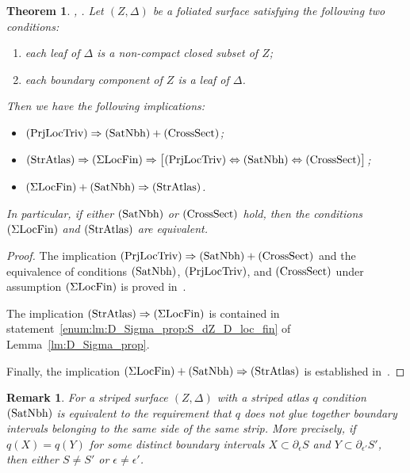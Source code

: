 \documentclass[12pt, reqno]{amsart}
\newcommand{\theoremname}{Theorem}%
\newcommand{\remarkname}{Remark}%
\newtheorem{theorem}[subsection]{\protect\theoremname}
\newtheorem{remark}[subsection]{\protect\remarkname}
\newcommand\Xsp{X}
\newcommand\Ysp{Y}
\newcommand{\Partition}{\Delta}
\newcommand{\strip}{S}
\newcommand{\stripSurf}{Z}
\newcommand{\qmap}{q}
\begin{document}
\begin{theorem}\label{th:rel_between_conditions}{\rm\cite{MaksymenkoPolulyakh:MFAT:2016}, \cite{MaksymenkoPolulyakh:PGC:2016}}.
Let $(\stripSurf,\Partition)$ be a foliated surface satisfying the following two conditions:
\begin{enumerate}[label={\rm(\roman*)}]
\item\label{enum:genfolsurf:closed_leaves}
each leaf of $\Partition$ is a non-compact closed subset of $\stripSurf$;
\item\label{enum:genfolsurf:bd_leaves}
each boundary component of $\stripSurf$ is a leaf of $\Partition$.
\end{enumerate}
Then we have the following implications:
\begin{itemize}[leftmargin=*]
\item $\mathrm{(PrjLocTriv)} \Rightarrow \mathrm{(SatNbh)} + \mathrm{(CrossSect)}$;
\item $\mathrm{(StrAtlas)}\Rightarrow\mathrm{(\Sigma LocFin)}\Rightarrow \bigl[ \mathrm{(PrjLocTriv)} \Leftrightarrow \mathrm{(SatNbh)} \Leftrightarrow \mathrm{(CrossSect)} \bigr]$;
\item $\mathrm{(\Sigma LocFin)} + \mathrm{(SatNbh)} \Rightarrow \mathrm{(StrAtlas)}$.
\end{itemize}
In particular, if either $\mathrm{(SatNbh)}$ or $\mathrm{(CrossSect)}$ hold, then the conditions $\mathrm{(\Sigma LocFin)}$ and $\mathrm{(StrAtlas)}$ are equivalent.
\end{theorem}
\begin{proof}
The implication $\mathrm{(PrjLocTriv)} \Rightarrow \mathrm{(SatNbh)} + \mathrm{(CrossSect)}$ and the equivalence of conditions $\mathrm{(SatNbh)}$, $\mathrm{(PrjLocTriv)}$, and $\mathrm{(CrossSect)}$ under assumption $\mathrm{(\Sigma LocFin)}$ is proved in~\cite[Theorem~2.8]{MaksymenkoPolulyakh:MFAT:2016}.

The implication $\mathrm{(StrAtlas)}\Rightarrow\mathrm{(\Sigma LocFin)}$ is contained in statement~\ref{enum:lm:D_Sigma_prop:S_dZ_D_loc_fin} of Lemma~\ref{lm:D_Sigma_prop}.

Finally, the implication $\mathrm{(\Sigma LocFin)} + \mathrm{(SatNbh)} \Rightarrow \mathrm{(StrAtlas)}$ is established in~\cite[Theorem~1.8]{MaksymenkoPolulyakh:PGC:2016}.
\end{proof}


\begin{remark}
For a striped surface $(\stripSurf,\Partition)$ with a striped atlas $\qmap$ condition~$\mathrm{(SatNbh)}$ is equivalent to the requirement that \textit{$\qmap$ does not glue together boundary intervals belonging to the same side of the same strip}.
More precisely, if $\qmap(\Xsp) = \qmap(\Ysp)$ for some distinct boundary intervals $\Xsp \subset \partial_{\epsilon}\strip$ and $\Ysp \subset \partial_{\epsilon'}\strip'$, then either $\strip\not=\strip'$ or $\epsilon\not=\epsilon'$.
\end{remark}
\end{document}
